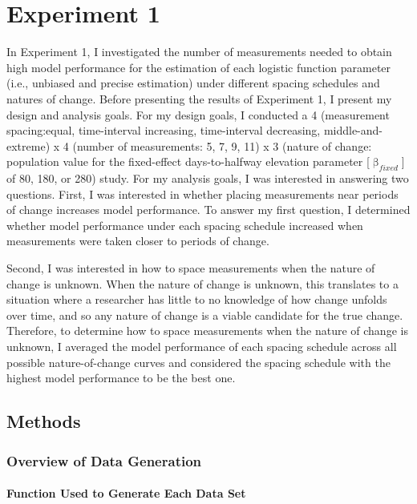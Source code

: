 \documentclass[
12pt, %
twoside,
english]{guelphthesis}
\begin{document}
\hypertarget{exp-1}{%
\chapter{Experiment 1}\label{exp-1}}

In Experiment 1, I investigated the number of measurements needed to obtain high model performance for the estimation of each logistic function parameter (i.e., unbiased and precise estimation) under different spacing schedules and natures of change. Before presenting the results of Experiment 1, I present my design and analysis goals. For my design goals, I conducted a 4 (measurement spacing:equal, time-interval increasing, time-interval decreasing, middle-and-extreme) x 4 (number of measurements: 5, 7, 9, 11) x 3 (nature of change: population value for the fixed-effect days-to-halfway elevation parameter {[}\(\upbeta_{fixed}\){]} of 80, 180, or 280) study. For my analysis goals, I was interested in answering two questions. First, I was interested in whether placing measurements near periods of change increases model performance. To answer my first question, I determined whether model performance under each spacing schedule increased when measurements were taken closer to periods of change.

Second, I was interested in how to space measurements when the nature of change is unknown. When the nature of change is unknown, this translates to a situation where a researcher has little to no knowledge of how change unfolds over time, and so any nature of change is a viable candidate for the true change. Therefore, to determine how to space measurements when the nature of change is unknown, I averaged the model performance of each spacing schedule across all possible nature-of-change curves and considered the spacing schedule with the highest model performance to be the best one.

\hypertarget{methods}{%
\section{Methods}\label{methods}}

\hypertarget{data-generation}{%
\subsection{Overview of Data Generation}\label{data-generation}}

\hypertarget{function-used-to-generate-each-data-set}{%
\subsubsection{Function Used to Generate Each Data Set}\label{function-used-to-generate-each-data-set}}
\end{document}
